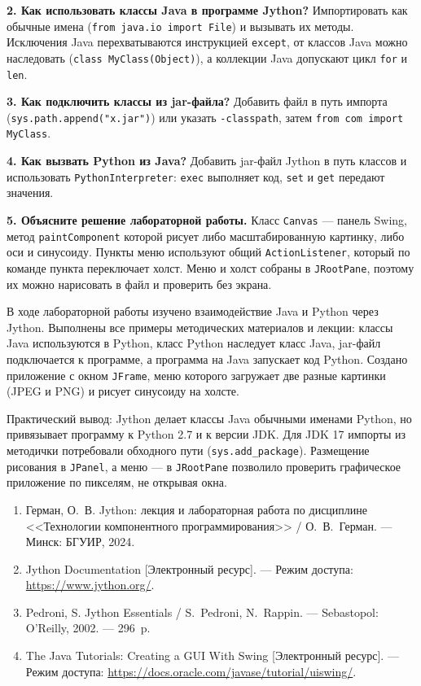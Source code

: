 \documentclass[14pt,a4paper]{extarticle}
\begin{document}
\textbf{2. Как использовать классы Java в программе Jython?} Импортировать как
обычные имена (\texttt{from java.io import File}) и вызывать их методы. Исключения
Java перехватываются инструкцией \texttt{except}, от классов Java можно наследовать
(\texttt{class MyClass(Object)}), а коллекции Java допускают цикл \texttt{for} и
\texttt{len}.

\textbf{3. Как подключить классы из jar-файла?} Добавить файл в путь импорта
(\texttt{sys.path.append("x.jar")}) или указать \texttt{-classpath}, затем
\texttt{from com import MyClass}.

\textbf{4. Как вызвать Python из Java?} Добавить jar-файл Jython в путь классов и
использовать \texttt{PythonInterpreter}: \texttt{exec} выполняет код, \texttt{set} и
\texttt{get} передают значения.

\textbf{5. Объясните решение лабораторной работы.} Класс \texttt{Canvas} --- панель
Swing, метод \texttt{paintComponent} которой рисует либо масштабированную картинку, либо
оси и синусоиду. Пункты меню используют общий \texttt{ActionListener}, который по
команде пункта переключает холст. Меню и холст собраны в \texttt{JRootPane}, поэтому их
можно нарисовать в файл и проверить без экрана.


В ходе лабораторной работы изучено взаимодействие Java и Python через Jython.
Выполнены все примеры методических материалов и лекции: классы Java используются в
Python, класс Python наследует класс Java, jar-файл подключается к программе, а
программа на Java запускает код Python. Создано приложение с окном \texttt{JFrame},
меню которого загружает две разные картинки (JPEG и PNG) и рисует синусоиду на холсте.

Практический вывод: Jython делает классы Java обычными именами Python, но привязывает
программу к Python 2.7 и к версии JDK. Для JDK 17 импорты из методички потребовали
обходного пути (\texttt{sys.add\_package}). Размещение рисования в \texttt{JPanel}, а
меню --- в \texttt{JRootPane} позволило проверить графическое приложение по
пикселям, не открывая окна.


\begin{enumerate}
\item Герман, О.~В. Jython: лекция и лабораторная работа по дисциплине <<Технологии
компонентного программирования>> / О.~В.~Герман. --- Минск: БГУИР, 2024.
\item Jython Documentation [Электронный ресурс]. --- Режим доступа:
\url{https://www.jython.org/}.
\item Pedroni, S. Jython Essentials / S.~Pedroni, N.~Rappin. --- Sebastopol:
O'Reilly, 2002. --- 296~p.
\item The Java Tutorials: Creating a GUI With Swing [Электронный ресурс]. --- Режим
доступа: \url{https://docs.oracle.com/javase/tutorial/uiswing/}.
\end{enumerate}
\end{document}
